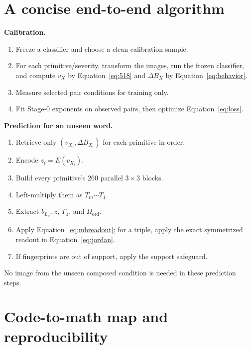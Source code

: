 \documentclass[11pt,a4paper]{article}
\newcommand{\dB}{\Delta B}
\begin{document}
\section{A concise end-to-end algorithm}

\textbf{Calibration.}
\begin{enumerate}
  \item Freeze a classifier and choose a clean calibration sample.
  \item For each primitive/severity, transform the images, run the frozen
  classifier, and compute $v_X$ by Equation~\eqref{eq:518} and $\dB_X$ by
  Equation~\eqref{eq:behavior}.
  \item Measure selected pair conditions for training only.
  \item Fit Stage-0 exponents on observed pairs, then optimize
  Equation~\eqref{eq:loss}.
\end{enumerate}

\textbf{Prediction for an unseen word.}
\begin{enumerate}
  \item Retrieve only $(v_{X_i},\dB_{X_i})$ for each primitive in order.
  \item Encode $z_i=E(v_{X_i})$.
  \item Build every primitive's 260 parallel $3\times3$ blocks.
  \item Left-multiply them as $T_m\cdots T_1$.
  \item Extract $b_{L_p}$, $\bar z$, $\Gamma_z$, and $\Omega_{\mathrm{ord}}$.
  \item Apply Equation~\eqref{eq:mbreadout}; for a triple, apply the exact
  symmetrized readout in Equation~\eqref{eq:jordan}.
  \item If fingerprints are out of support, apply the support safeguard.
\end{enumerate}

No image from the unseen composed condition is needed in these prediction
steps.

\section{Code-to-math map and reproducibility}
\end{document}
